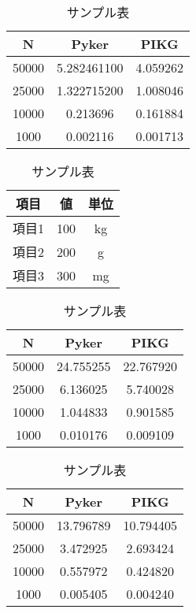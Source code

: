 \documentclass[a4j]{jarticle} %
\begin{document}
  \begin{table}[ht]
    \centering %
    \caption{サンプル表} %
    \label{tab:sampletable1}
    \begin{tabular}{ccc} %
    \toprule
    N & Pyker & PIKG \\
    \midrule
    50000 & 5.282461100 & 4.059262 \\\hline
    25000 & 1.322715200 & 1.008046 \\\hline
    10000 & 0.213696 & 0.161884 \\\hline
    1000 & 0.002116 & 0.001713 \\\hline
  \bottomrule
  \end{tabular}
  \end{table}
  \begin{table}[ht]
    \centering %
    \caption{サンプル表} %
    \label{tab:sampletable2}
    \begin{tabular}{ccc} %
    \toprule
    項目 & 値 & 単位 \\
    \midrule
    項目1 & 100 & kg \\
    項目2 & 200 & g \\
    項目3 & 300 & mg \\
  \bottomrule
  \end{tabular}
  \end{table}


  \begin{table}[ht]
    \centering %
    \caption{サンプル表} %
    \label{tab:sampletable3}
    \begin{tabular}{ccc} %
    \toprule
    N & Pyker & PIKG \\
    \midrule
    50000 & 24.755255 & 22.767920 \\
    25000 & 6.136025 & 5.740028 \\
    10000 & 1.044833 & 0.901585\\
    1000 & 0.010176 & 0.009109 \\
  \bottomrule
  \end{tabular}
  \end{table}

  \begin{table}[ht]
    \centering %
    \caption{サンプル表} %
    \label{tab:sampletable4}
    \begin{tabular}{ccc} %
    \toprule
    N & Pyker & PIKG \\
    \midrule
    50000 & 13.796789& 10.794405\\
    25000 & 3.472925 & 2.693424\\
    10000 & 0.557972 & 0.424820\\
    1000 & 0.005405& 0.004240\\
  \bottomrule
  \end{tabular}
  \end{table}
\end{document}
